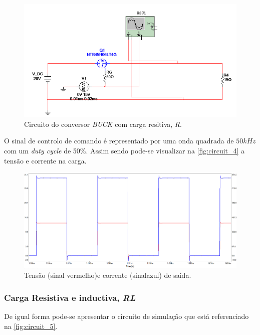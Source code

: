 \documentclass[a4paper,11pt]{article}
\numberwithin{equation}{section}
\begin{document}
\begin{figure}[h]
	\centering
	\includegraphics[keepaspectratio=true, scale=0.6]{img/circuito1}
	\caption{Circuito do conversor \textit{BUCK} com carga resitiva, \textit{R}.}
	\label{fig:circuit_3}
	\vspace{-0.8em}
\end{figure}

O sinal de controlo de comando é representado por uma onda quadrada de $50kHz$ com um \textit{duty cycle} de 50\%. Assim sendo pode-se visualizar na \autoref{fig:circuit_4} a tensão e corrente na carga.

\begin{figure}[h]
	\centering
	\includegraphics[keepaspectratio=true, scale=0.4]{img/circuito2}
	\caption{Tensão (sinal vermelho)e corrente (sinalazul) de saida.}
	\label{fig:circuit_4}
	\vspace{-0.8em}
\end{figure}

\pagebreak
\subsubsection{Carga Resistiva e inductiva, \textit{RL}}

De igual forma pode-se apresentar o circuito de simulação que está referenciado na \autoref{fig:circuit_5}.
\end{document}
